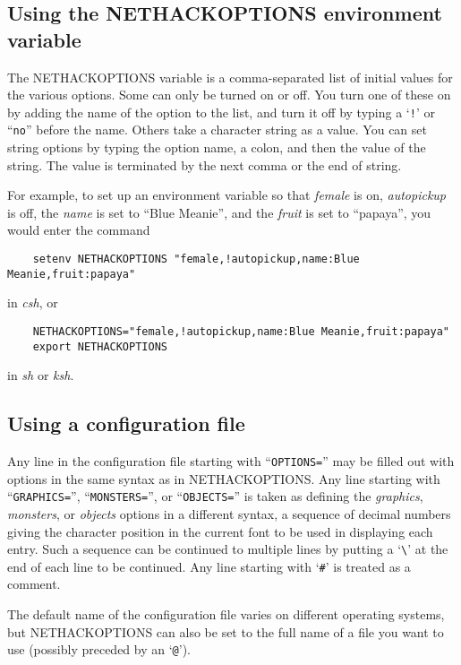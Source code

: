 \subsection*{Using the NETHACKOPTIONS environment variable}

The NETHACKOPTIONS variable is a comma-separated list of initial
values for the various options.  Some can only be turned on or off.
You turn one of these on by adding the name of the option to the list,
and turn it off by typing a `{\tt !}' or ``{\tt no}'' before the name.
Others take a
character string as a value.  You can set string options by typing
the option name, a colon, and then the value of the string.  The value
is terminated by the next comma or the end of string.

For example, to set up an environment variable so that {\it female\/}
is on, {\it autopickup\/} is off, the {\it name\/} is set to ``Blue Meanie'',
and the {\it fruit\/} is set to ``papaya'', you would enter the command
\begin{verbatim}
    setenv NETHACKOPTIONS "female,!autopickup,name:Blue Meanie,fruit:papaya"
\end{verbatim}

\nd in {\it csh}, or
\begin{verbatim}
    NETHACKOPTIONS="female,!autopickup,name:Blue Meanie,fruit:papaya"
    export NETHACKOPTIONS
\end{verbatim}

\nd in {\it sh\/} or {\it ksh}.

\subsection*{Using a configuration file}

Any line in the configuration file starting with ``{\tt OPTIONS=}'' may be
filled out with options in the same syntax as in NETHACKOPTIONS.
Any line starting with ``{\tt GRAPHICS=}'', ``{\tt MONSTERS=}'', or
``{\tt OBJECTS=}''
is taken as defining the {\it graphics\/}, {\it monsters\/}, or
{\it objects\/} options in a different syntax,
a sequence of decimal numbers giving the character position
in the current font to be used in displaying each entry.
Such a sequence can be continued to multiple lines by putting a
`{\tt \verb+\+}' at the end of each line to be continued.
Any line starting with `{\tt \#}' is treated as a comment.

The default name of the configuration file varies on different
operating systems, but NETHACKOPTIONS can also be set to
the full name of a file you want to use (possibly preceded by an `{\tt @}').

